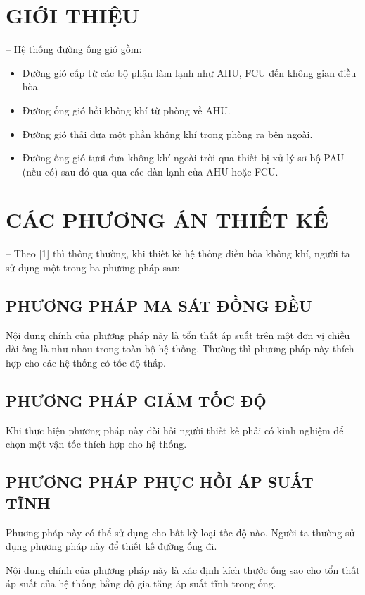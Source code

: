 \section{GIỚI THIỆU}
-- Hệ thống đường ống gió gồm:
\begin{itemize}
	\item Đường gió cấp từ các bộ phận làm lạnh như AHU, FCU đến không gian điều hòa.
	\item Đường ống gió hồi không khí từ phòng về AHU.
	\item Đường gió thải đưa một phần không khí trong phòng ra bên ngoài.
	\item Đường ống gió tươi đưa không khí ngoài trời qua thiết bị xử lý sơ bộ PAU (nếu có) sau đó qua qua các dàn lạnh của AHU hoặc FCU.
\end{itemize}

\section{CÁC PHƯƠNG ÁN THIẾT KẾ}
-- Theo [1] thì thông thường, khi thiết kế hệ thống điều hòa không khí, người ta sử dụng một trong ba phương pháp sau:
\subsection{PHƯƠNG PHÁP MA SÁT ĐỒNG ĐỀU}
Nội dung chính của phương pháp này là tổn thất áp suất trên một đơn vị chiều dài ống là như nhau trong toàn bộ hệ thống. Thường thì phương pháp này thích hợp cho các hệ thống có tốc độ thấp.
\subsection{PHƯƠNG PHÁP GIẢM TỐC ĐỘ}
Khi thực hiện phương pháp này đòi hỏi người thiết kế phải có kinh nghiệm để chọn một vận tốc thích hợp cho hệ thống.
\subsection{PHƯƠNG PHÁP PHỤC HỒI ÁP SUẤT TĨNH}
Phương pháp này có thể sử dụng cho bất kỳ loại tốc độ nào. Người ta thường sử dụng phương pháp này để thiết kế đường ống đi.

Nội dung chính của phương pháp này là xác định kích thước ống sao cho tổn thất áp suất của hệ thống bằng độ gia tăng áp suất tĩnh trong ống.

